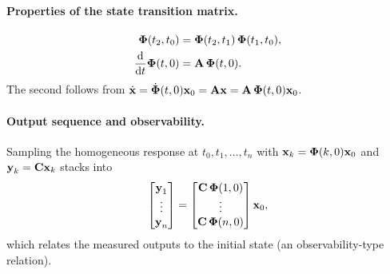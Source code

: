 \paragraph{Properties of the state transition matrix.}
\begin{align}
\boldsymbol{\mathbf{\Phi}}(t_2,t_0) &= \boldsymbol{\mathbf{\Phi}}(t_2,t_1)\,\boldsymbol{\mathbf{\Phi}}(t_1,t_0), \\
\frac{\mathrm{d}}{\mathrm{d}t}\boldsymbol{\mathbf{\Phi}}(t,0) &= \boldsymbol{\mathbf{A}}\,\boldsymbol{\mathbf{\Phi}}(t,0).
\end{align}
The second follows from $\dot{\boldsymbol{\mathbf{x}}} = \dot{\boldsymbol{\mathbf{\Phi}}}(t,0)\boldsymbol{\mathbf{x}}_0 = \boldsymbol{\mathbf{A}}\boldsymbol{\mathbf{x}} = \boldsymbol{\mathbf{A}}\,\boldsymbol{\mathbf{\Phi}}(t,0)\boldsymbol{\mathbf{x}}_0$.

\paragraph{Output sequence and observability.}
Sampling the homogeneous response at $t_0,t_1,\dots,t_n$ with $\boldsymbol{\mathbf{x}}_k = \boldsymbol{\mathbf{\Phi}}(k,0)\boldsymbol{\mathbf{x}}_0$ and $\boldsymbol{\mathbf{y}}_k = \boldsymbol{\mathbf{C}}\boldsymbol{\mathbf{x}}_k$ stacks into
\begin{align}
\begin{bmatrix} \boldsymbol{\mathbf{y}}_1 \\ \vdots \\ \boldsymbol{\mathbf{y}}_n \end{bmatrix}
=
\begin{bmatrix} \boldsymbol{\mathbf{C}}\,\boldsymbol{\mathbf{\Phi}}(1,0) \\ \vdots \\ \boldsymbol{\mathbf{C}}\,\boldsymbol{\mathbf{\Phi}}(n,0) \end{bmatrix} \boldsymbol{\mathbf{x}}_0,
\end{align}
which relates the measured outputs to the initial state (an observability-type relation).

